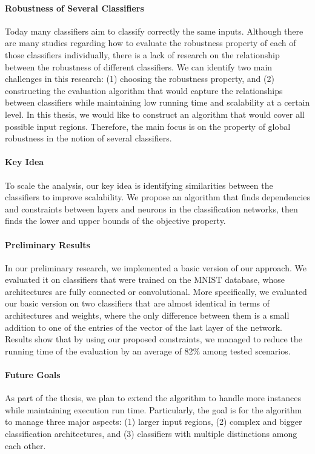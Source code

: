 \paragraph{Robustness of Several Classifiers}
Today many classifiers aim to classify correctly the same inputs. Although there are many studies regarding how to evaluate the robustness property of each of those classifiers individually, there is a lack of research on the relationship between the robustness of different classifiers. We can identify two main challenges in this research: (1) choosing the robustness property, and (2) constructing the evaluation algorithm that would capture the relationships between classifiers while maintaining low running time and scalability at a certain level. In this thesis, we would like to construct an algorithm that would cover all possible input regions. Therefore, the main focus is on the property of global robustness in the notion of several classifiers.


\paragraph{Key Idea}
To scale the analysis, our key idea is identifying similarities between the classifiers to improve scalability.
We propose an algorithm that finds dependencies and constraints between layers and neurons in the classification networks, then finds the lower and upper bounds of the objective property.


\paragraph{Preliminary Results}
In our preliminary research, we implemented a basic version of our approach. We evaluated it on classifiers that were trained on the MNIST database, whose architectures are fully connected or convolutional. More specifically, we evaluated our basic version on two classifiers that are almost identical in terms of architectures and weights, where the only difference between them is a small addition to one of the entries of the vector of the last layer of the network. Results show that by using our proposed constraints, we managed to reduce the running time of the evaluation by an average of 82\% among tested scenarios.


\paragraph{Future Goals}
As part of the thesis, we plan to extend the algorithm to handle more instances while maintaining execution run time. Particularly, the goal is for the algorithm to manage three major aspects: (1) larger input regions, (2) complex and bigger classification architectures, and (3) classifiers with multiple distinctions among each other. 